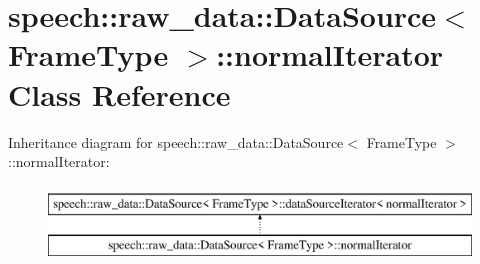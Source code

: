 \hypertarget{classspeech_1_1raw__data_1_1DataSource_1_1normalIterator}{\section{speech\+:\+:raw\+\_\+data\+:\+:Data\+Source$<$ Frame\+Type $>$\+:\+:normal\+Iterator Class Reference}
\label{classspeech_1_1raw__data_1_1DataSource_1_1normalIterator}
}
Inheritance diagram for speech\+:\+:raw\+\_\+data\+:\+:Data\+Source$<$ Frame\+Type $>$\+:\+:normal\+Iterator\+:\begin{figure}[H]
\begin{center}
\leavevmode
\includegraphics[height=2.000000cm]{classspeech_1_1raw__data_1_1DataSource_1_1normalIterator}
\end{center}
\end{figure}
